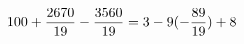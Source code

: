 \documentclass[preview]{standalone}
\begin{document}
\begin{align*}
\special{dvisvgm:raw <g id='unique000'>}100 + \frac{2670}{19} - \frac{3560}{19} = 3 - 9 (- \frac{89}{19}) + 8\special{dvisvgm:raw </g>}
\end{align*}
\end{document}
